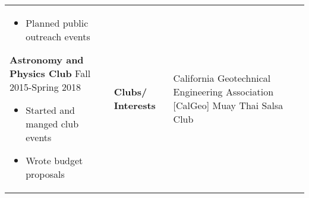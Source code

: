 \documentclass[10pt]{article}
\newcommand*\leftright[2]{%
  \leavevmode
  \rlap{#1}%
  \hspace{0.5\linewidth}%
  #2}
\begin{document}
\begin{tabular}{l l l l}
{\begin{itemize}[noitemsep,nolistsep]
            \item Planned public outreach events
        \end{itemize}
        \textbf{Astronomy and Physics Club} \newline
        \leftright{\textit{President}}{Fall 2015-Spring 2018}
        \begin{itemize}[noitemsep,nolistsep]
            \item Started and manged club events
            \item Wrote budget proposals
        \end{itemize}}  &
            \multicolumn{1}{p{1cm}}{\textbf{Clubs/ \newline Interests}}   &
                \multicolumn{1}{p{6cm}}{
                California Geotechnical Engineering Association [CalGeo] \newline
                Muay Thai \newline
                Salsa Club
                }
\end{tabular}
\end{document}

